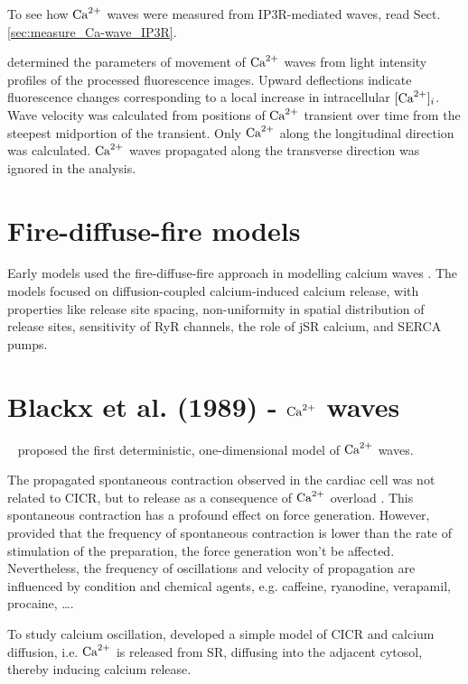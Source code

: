 To see how ${\text{Ca}^{2+}}$ waves were measured from IP3R-mediated waves, read
Sect.\ref{sec:measure_Ca-wave_IP3R}.
 
\citep{wier2000} determined the parameters of movement of ${\text{Ca}^{2+}}$ waves from light
intensity profiles of the processed fluorescence images. Upward deflections
indicate fluorescence changes corresponding to a local increase in intracellular
$[{\text{Ca}^{2+}}]_i$. Wave velocity was calculated from positions of ${\text{Ca}^{2+}}$ transient over
time from the steepest midportion of the transient. Only ${\text{Ca}^{2+}}$ along the
longitudinal direction was calculated. ${\text{Ca}^{2+}}$ waves propagated along the
transverse direction was ignored in the analysis.




\section{Fire-diffuse-fire models}

Early models used the fire-diffuse-fire approach in modelling calcium waves
\citep{bugrim1997, keizer1998, izu2001, subramanian2001}. The models focused on
diffusion-coupled calcium-induced calcium release, with properties like release
site spacing, non-uniformity in spatial distribution of release sites,
sensitivity of RyR channels, the role of jSR calcium, and SERCA pumps.

\section{Blackx et al. (1989) - ${\text{Ca}^{2+}}$ waves}
\label{sec:blackx-et-al}

~\cite{backx1989} proposed the first deterministic, one-dimensional
model of ${\text{Ca}^{2+}}$ waves.

The propagated spontaneous contraction observed in the cardiac cell was not
related to CICR, but to release as a consequence of ${\text{Ca}^{2+}}$ overload
\citep{fabiato1985scc}. This spontaneous contraction has a profound effect on
force generation. However, provided that the frequency of spontaneous
contraction is lower than the rate of stimulation of the preparation, the force
generation won't be affected. Nevertheless, the frequency of oscillations and
velocity of propagation are influenced by condition and chemical agents, e.g.
caffeine, ryanodine, verapamil, procaine, \ldots.

To study calcium oscillation, \citep{backx1989} developed a simple model of CICR
and calcium diffusion, i.e. ${\text{Ca}^{2+}}$ is released from SR, diffusing into the
adjacent cytosol, thereby inducing calcium release.

